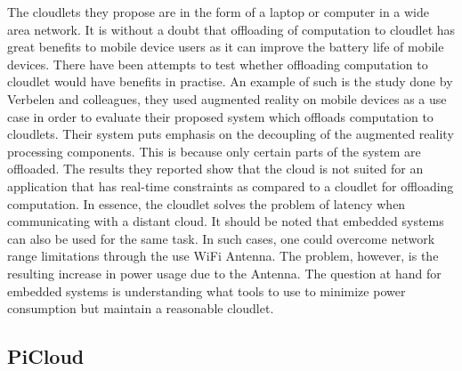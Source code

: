 \noindent The cloudlets they propose are in the form of a laptop or computer in a wide area network. It is without a doubt that offloading of computation to cloudlet has great benefits to mobile device users as it can improve the battery life of mobile devices. There have been attempts to test
whether offloading computation to cloudlet would have benefits in practise. An example of such is the study done by Verbelen and colleagues\cite{RefWorks:93}, they used augmented reality on mobile devices as a use case in order to evaluate their proposed system which offloads computation to cloudlets. Their system puts emphasis on the decoupling of the augmented reality processing components.
This is because only certain parts of the system are offloaded. The results they reported show that the cloud is not suited for an application that has real-time constraints as compared to a cloudlet for offloading computation. In essence, the cloudlet solves the problem of latency when communicating with a distant cloud. It should be noted that embedded systems can also be used for the same task. In such cases, one could overcome network range limitations through the use WiFi Antenna. The problem, however, is the resulting increase in power usage due to the Antenna. The question at hand for
embedded systems is understanding what tools to use to minimize power consumption but maintain a reasonable cloudlet.\newline

\subsection{PiCloud}


